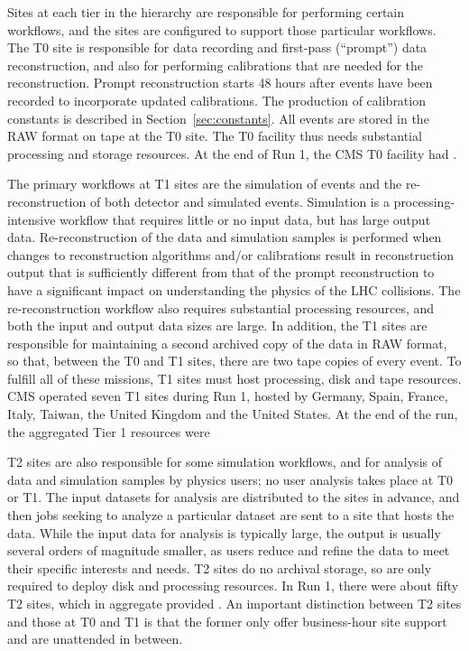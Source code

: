Sites at each tier in the hierarchy are responsible for performing certain
workflows, and the sites are configured to support those particular
workflows.    The T0 site is responsible for data recording
and first-pass (``prompt'') data reconstruction, and also for performing
calibrations that are needed for the reconstruction.  Prompt reconstruction
starts 48 hours after events have been recorded to incorporate updated
calibrations.  The production of calibration constants is described in
Section~\ref{sec:constants}.  All events are stored in the RAW format on
tape at the T0 site.    The T0 facility thus
needs substantial processing and storage resources.  At the end of Run 1,
the CMS T0 facility had .

The primary workflows at T1 sites are the simulation of events and the
re-reconstruction of both detector and simulated events.  Simulation is a
processing-intensive workflow that requires little or no input data, but
has large output data.  Re-reconstruction of the data and simulation
samples is performed when changes to reconstruction algorithms and/or
calibrations result in reconstruction output that is sufficiently different
from that of the prompt reconstruction to have a significant impact on
understanding the physics of the LHC collisions.  The re-reconstruction
workflow also requires substantial processing resources, and both the input
and output data sizes are large.  In addition, the T1 sites are responsible
for maintaining a second archived copy of the data in RAW format, so that,
between the T0 and T1 sites, there are two tape copies of every event.  To
fulfill all of these missions, T1 sites must host processing, disk and tape
resources.  CMS operated seven T1 sites during Run 1, hosted by Germany,
Spain, France, Italy, Taiwan, the United Kingdom and the United States.  At
the end of the run, the aggregated Tier 1 resources were 

T2 sites are also responsible for some simulation workflows, and for
analysis of data and simulation samples by physics users; no user analysis
takes place at T0 or T1.  The input datasets for analysis are distributed
to the sites in advance, and then jobs seeking to analyze a particular
dataset are sent to a site that hosts the data.  While the input data for
analysis is typically large, the output is usually several orders of
magnitude smaller, as users reduce and refine the data to meet their
specific interests and needs.    T2 sites do no archival
storage, so are only required to deploy disk and processing resources.  In
Run 1, there were about fifty T2 sites, which in aggregate provided
.  An important distinction between T2
sites and those at T0 and T1 is that the former only offer business-hour
site support and are unattended in between.

